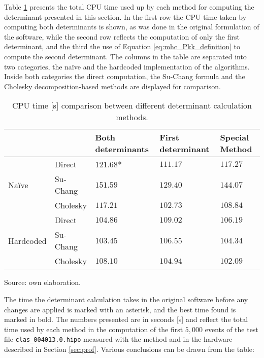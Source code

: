 Table \ref{tab:det_method_times} presents the total CPU time used up by each method for computing the determinant presented in this section.
In the first row the CPU time taken by computing both determinants is shown, as was done in the original formulation of the software, while the second row reflects the computation of only the first determinant, and the third the use of Equation \eqref{eq:mhc_Pkk_definition} to compute the second determinant.
The columns in the table are separated into two categories, the na\"ive and the hardcoded implementation of the algorithms.
Inside both categories the direct computation, the Su-Chang formula and the Cholesky decomposition-based methods are displayed for comparison.

    \begin{table}[ht]
        \begin{tabular}{@{}ll|lll@{}}
                                                            &          & Both determinants & First determinant & Special Method \\ \midrule
            \multicolumn{1}{l|}{\multirow{3}{*}{Na\"ive}}   & Direct   & $121.68$*         & $111.17$          & $117.27$       \\
            \multicolumn{1}{l|}{}                           & Su-Chang & $151.59$          & $129.40$          & $144.07$       \\
            \multicolumn{1}{l|}{}                           & Cholesky & $117.21$          & $102.73$          & $108.84$       \\ \midrule
            \multicolumn{1}{l|}{\multirow{3}{*}{Hardcoded}} & Direct   & $104.86$          & $109.02$          & $106.19$       \\
            \multicolumn{1}{l|}{}                           & Su-Chang & $103.45$          & $106.55$          & $104.34$       \\
            \multicolumn{1}{l|}{}                           & Cholesky & $108.10$          & $104.94$          & $\mathbf{102.09}$
        \end{tabular}
        \caption{\label{tab:det_method_times} CPU time [s] comparison between different determinant calculation methods.} Source: own elaboration.
    \end{table}

The time the determinant calculation takes in the original software before any changes are applied is marked with an asterisk, and the best time found is marked in bold.
The numbers presented are in seconds [s] and reflect the total time used by each method in the computation of the first $5,000$ events of the test file \texttt{clas\_004013.0.hipo} measured with the method and in the hardware described in Section \ref{sec:prof}.
Various conclusions can be drawn from the table:

